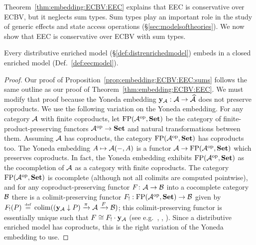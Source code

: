 \documentclass{LMCS}
\newcommand{\colim}{\operatorname{colim}}
\newcommand{\Set}{\mathbf{Set}}
\newcommand{\opcat}[1]{#1^{\mathrm{op}}}
\newcommand{\defeq}{\mathrel{\,\stackrel{\mbox{\tiny{$\mathrm{def}$}}}=\,}}
\begin{document}
Theorem~\ref{thm:embedding:ECBV:EEC}
explains that EEC is conservative over ECBV,
but it neglects sum types.
Sum types play an important role in the study of 
generic effects and state access operations (\S\ref{sec:modelsoftheories}).
We now show that EEC is conservative over ECBV with sum types.
\begin{prop} 
\label{prop:embedding:ECBV:EEC:sums}
Every distributive enriched model (\S\ref{def:distrenrichedmodel})
embeds in a closed enriched model (Def.~\ref{def:eecmodel}).
\end{prop}
\newcommand{\Sind}[1]{\mathrm{FP}(\opcat{#1},\Set)}\newcommand{\Sindop}[1]{\mathrm{FP}(#1,\Set)}\begin{proof}
Our proof of Proposition~\ref{prop:embedding:ECBV:EEC:sums}
follows the same outline as our proof of Theorem~\ref{thm:embedding:ECBV:EEC}.
We must modify that proof because the Yoneda embedding
$\mathbf{y}_{\mathcal A}:\mathcal A\to\widehat{\mathcal A}$ does not preserve coproducts.
We use the following
variation on the Yoneda embedding. 
For any category $\mathcal A$ with finite coproducts,
let $\Sind\ACat$ be the category of finite-product-preserving functors
$\opcat\ACat\to\Set$ and natural transformations between them.
Assuming $\mathcal A$ has coproducts,
the category $\Sind\ACat$ has coproducts too.
The Yoneda embedding $A\mapsto\mathcal A(-,A)$ 
is a functor $\ACat\to \Sind\ACat$
which preserves coproducts.
In fact, the Yoneda embedding exhibits 
$\Sind\ACat$ as 
the cocompletion of $\mathcal A$ 
as a category with finite coproducts.
The category $\Sind\ACat$ is cocomplete 
(although not all colimits are computed pointwise),
and for any coproduct-preserving functor $F\colon \mathcal A\to\mathcal B$ 
into a cocomplete category~$\mathcal B$
there is a colimit-preserving functor $F_!:\Sind\ACat\to \BCat$
given by 
$F_!(P)\defeq \colim((\yoneda_\ACat\downarrow P)\xrightarrow \pi\ACat\xrightarrow F \BCat)$; this colimit-preserving functor is essentially 
unique such that $F\cong F_!\cdot \mathbf{y}_\mathcal A$
(see e.g.~\cite[Thms~5.86,~6.11]{Kelly:Book},
\cite{PowerRobinson:Premonoidal},
\cite{Fiore:enrichment}).
Since a distributive enriched model has coproducts,
this is the right variation of the Yoneda embedding to use.


\end{proof}
\end{document}
